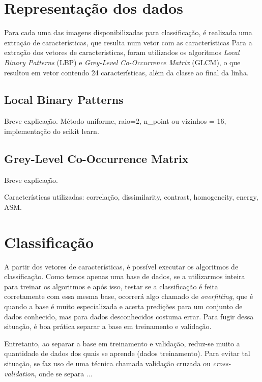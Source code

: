 \documentclass[conference]{IEEEtran}
\begin{document}
\section{Representação dos dados}

Para cada uma das imagens disponibilizadas para classificação, é realizada uma
extração de características, que resulta num vetor com as características
Para a extração dos vetores de caracteristicas, foram utilizados os algoritmos
\emph{Local Binary Patterns} (LBP) e \emph{Grey-Level Co-Occurrence Matrix}
(GLCM), o que resultou em vetor contendo 24 características, além da classe ao
final da linha.

\subsection{Local Binary Patterns}
Breve explicação. Método uniforme, raio=2, n\_point ou vizinhos = 16,
implementação do scikit learn.

\subsection{Grey-Level Co-Occurrence Matrix}

Breve explicação.

Características utilizadas: correlação, dissimilarity, contrast, homogeneity,
energy, ASM.

\section{Classificação}

A partir dos vetores de características, é possível executar os
algoritmos de classificação. Como temos apenas uma base de dados, se a
utilizarmos inteira para treinar os algoritmos e após isso, testar se a
classificação é feita corretamente com essa mesma base, ocorrerá algo chamado de
\emph{overfitting}, que é quando a base é muito especializada e acerta predições
para um conjunto de dados conhecido, mas para dados desconhecidos costuma errar.
Para fugir dessa situação, é boa prática separar a base em treinamento e
validação.

Entretanto, ao separar a base em treinamento e validação, reduz-se muito a
quantidade de dados dos quais se aprende (dados treinamento). Para evitar tal
situação, se faz uso de uma técnica chamada validação cruzada ou
\emph{cross-validation}, onde se separa ...
\end{document}

